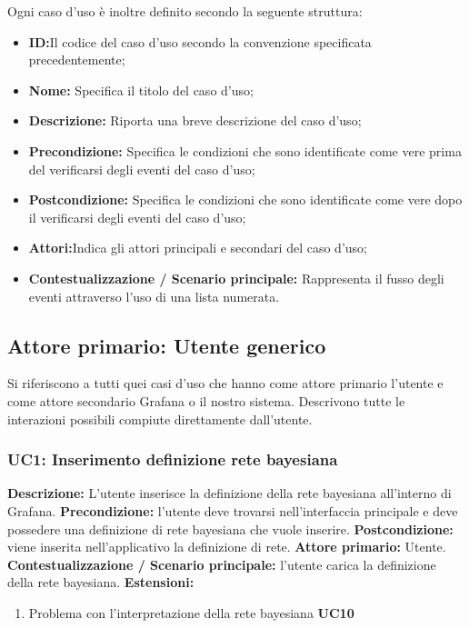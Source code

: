        \newline
        Ogni caso d'uso è inoltre definito secondo la seguente struttura:
         \begin{itemize}
           \item \textbf{ID:}Il codice del caso d'uso secondo la convenzione specificata precedentemente;
           \item \textbf{Nome:} Specifica il titolo del caso d'uso;
           \item \textbf{Descrizione:} Riporta una breve descrizione del caso d'uso;
           \item \textbf{Precondizione:} Specifica le condizioni che sono identificate come vere
prima del verificarsi degli eventi del caso d'uso;
           \item \textbf{Postcondizione:} Specifica le condizioni che sono identificate come
vere dopo il verificarsi degli eventi del caso d'uso;
		   \item \textbf{Attori:}Indica gli attori principali e secondari del caso d'uso;
           \item \textbf{Contestualizzazione / Scenario principale:} Rappresenta il fusso degli eventi attraverso l'uso di una lista numerata.
         \end{itemize}

		\subsection{Attore primario: Utente generico}
		Si riferiscono a tutti quei casi d'uso che hanno come attore primario l'utente e come attore secondario Grafana o il nostro sistema. Descrivono tutte le interazioni possibili compiute direttamente dall'utente.
				\subsubsection{UC1: Inserimento definizione rete bayesiana}
                	\textbf{Descrizione:} L'utente inserisce la definizione della rete bayesiana all'interno di Grafana.
                    \newline
                    \textbf{Precondizione:} l’utente deve trovarsi nell’interfaccia principale e deve possedere una definizione di rete bayesiana che vuole inserire.
                    \newline
                    \textbf{Postcondizione:} viene inserita nell’applicativo la definizione di rete.
                    \newline
                    \textbf{Attore primario:} Utente.
                    \newline
                    \textbf{Contestualizzazione / Scenario principale:} l’utente carica la definizione della rete bayesiana.
                    \newline
                    \textbf{Estensioni:} \begin{enumerate}
                            \item Problema con l’interpretazione della rete bayesiana \textbf{UC10}
                        \end{enumerate}
                        

